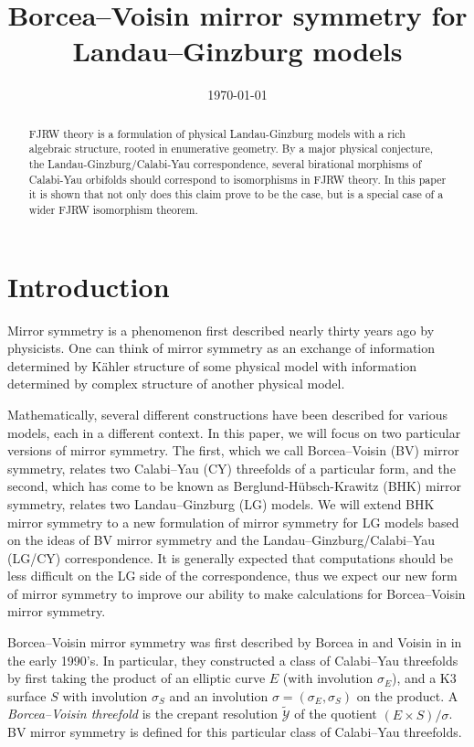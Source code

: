 \documentclass[10pt, letterpaper]{amsart}
\theoremstyle{remark}
\newcommand{\cY}{\mathcal{Y}}
\begin{document}
\date{\today}

\title{Borcea--Voisin mirror symmetry for Landau--Ginzburg models}

\begin{abstract}
FJRW theory is a formulation of physical Landau-Ginzburg models with a rich algebraic structure, rooted in enumerative geometry. By a major physical conjecture, the Landau-Ginzburg/Calabi-Yau correspondence, several birational morphisms of Calabi-Yau orbifolds should correspond to isomorphisms in FJRW theory. In this paper it is shown that not only does this claim prove to be the case, but is a special case of a wider FJRW isomorphism theorem.
\end{abstract}


\maketitle



\section{Introduction}

Mirror symmetry is a phenomenon first described nearly thirty years ago by physicists. One can think of mirror symmetry as an exchange of information determined by K\"ahler structure of some physical model with information determined by complex structure of another physical model. 

Mathematically, several different constructions have been described for various models, each in a different context. In this paper, we will focus on two particular versions of mirror symmetry. The first, which we call Borcea--Voisin (BV) mirror symmetry, relates two Calabi--Yau (CY) threefolds of a particular form, and the second, which has come to be known as Berglund-H\"ubsch-Krawitz (BHK) mirror symmetry, relates two Landau--Ginzburg (LG) models. We will extend BHK mirror symmetry to a new formulation of mirror symmetry for LG models based on the ideas of BV mirror symmetry and the Landau--Ginzburg/Calabi--Yau (LG/CY) correspondence. It is generally expected that computations should be less difficult on the LG side of the correspondence, thus we expect our new form of mirror symmetry to improve our ability to make calculations for Borcea--Voisin mirror symmetry. 

Borcea--Voisin mirror symmetry was first described by Borcea in \cite{Borcea} and Voisin in \cite{Voisin} in the early 1990's. In particular, they constructed a class of Calabi--Yau threefolds by first taking the product of an elliptic curve $E$ (with involution $\sigma_E$), and a K3 surface $S$ with involution $\sigma_S$ and an involution $\sigma = (\sigma_E , \sigma_S)$ on the product. A \emph{Borcea--Voisin threefold} is the crepant resolution $\widetilde{\cY}$ of the quotient $(E \times S)/\sigma$. BV mirror symmetry is defined for this particular class of Calabi--Yau threefolds. 
\end{document}
